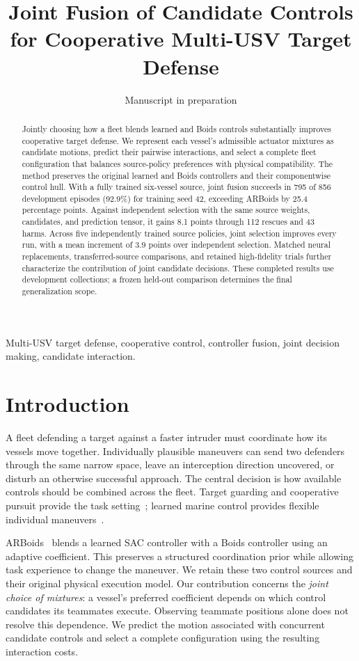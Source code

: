 \documentclass[journal]{IEEEtran}
\title{Joint Fusion of Candidate Controls for Cooperative Multi-USV Target Defense}
\author{Manuscript in preparation}
\begin{document}
\maketitle

\begin{abstract}
Jointly choosing how a fleet blends learned and Boids controls substantially improves cooperative target defense. We represent each vessel's admissible actuator mixtures as candidate motions, predict their pairwise interactions, and select a complete fleet configuration that balances source-policy preferences with physical compatibility. The method preserves the original learned and Boids controllers and their componentwise control hull. With a fully trained six-vessel source, joint fusion succeeds in 795 of 856 development episodes (92.9\%) for training seed 42, exceeding ARBoids by 25.4 percentage points. Against independent selection with the same source weights, candidates, and prediction tensor, it gains 8.1 points through 112 rescues and 43 harms. Across five independently trained source policies, joint selection improves every run, with a mean increment of 3.9 points over independent selection. Matched neural replacements, transferred-source comparisons, and retained high-fidelity trials further characterize the contribution of joint candidate decisions. These completed results use development collections; a frozen held-out comparison determines the final generalization scope.
\end{abstract}
\begin{IEEEkeywords}
Multi-USV target defense, cooperative control, controller fusion, joint decision making, candidate interaction.
\end{IEEEkeywords}

\section{Introduction}
A fleet defending a target against a faster intruder must coordinate how its vessels move together. Individually plausible maneuvers can send two defenders through the same narrow space, leave an interception direction uncovered, or disturb an otherwise successful approach. The central decision is how available controls should be combined across the fleet. Target guarding and cooperative pursuit provide the task setting~\cite{fu,chen,fang}; learned marine control provides flexible individual maneuvers~\cite{guo,xue,lin}.

ARBoids~\cite{tao} blends a learned SAC controller with a Boids controller using an adaptive coefficient. This preserves a structured coordination prior while allowing task experience to change the maneuver. We retain these two control sources and their original physical execution model. Our contribution concerns the \emph{joint choice of mixtures}: a vessel's preferred coefficient depends on which control candidates its teammates execute. Observing teammate positions alone does not resolve this dependence. We predict the motion associated with concurrent candidate controls and select a complete configuration using the resulting interaction costs.
\end{document}
